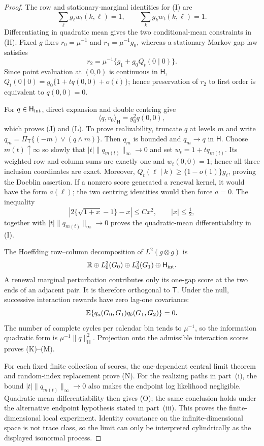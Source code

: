 \begin{proof}
The row and stationary-marginal identities for \textup{(I)} are
\[
 \sum_\ell g_\ell w_t(k,\ell)=1,
 \qquad
 \sum_k g_kw_t(k,\ell)=1.
\]
Differentiating in quadratic mean gives the two conditional-mean constraints
in \textup{(H)}.  Fixed $g$ fixes $r_0=\mu^{-1}$ and
$r_1=\mu^{-1}g_0$, whereas a stationary Markov gap law satisfies
\[
 r_2=\mu^{-1}\{g_1+g_0Q_t(0\mid0)\}.
\]
Since point evaluation at $(0,0)$ is continuous in $\mathsf H$,
$Q_t(0\mid0)=g_0\{1+tq(0,0)+o(t)\}$; hence preservation of $r_2$ to first
order is equivalent to $q(0,0)=0$.

For $q\in\mathsf H_{\rm int}$, direct expansion and double centring give
\[
 \langle q,v_0\rangle_{\mathsf H}=g_0^2q(0,0),
\]
which proves \textup{(J)} and \textup{(L)}.  To prove realizability, truncate
$q$ at levels $m$ and write
$q_m=\Pi_{\mathsf T}\{(-m)\vee(q\wedge m)\}$.  Then $q_m$ is bounded and
$q_m\to q$ in $\mathsf H$.  Choose $m(t)\uparrow\infty$ so slowly that
$|t|\|q_{m(t)}\|_\infty\to0$ and set
$w_t=1+tq_{m(t)}$.  Its weighted row and column sums are exactly one and
$w_t(0,0)=1$; hence all three inclusion coordinates are exact.  Moreover,
$Q_t(\ell\mid k)\geq\{1-o(1)\}g_\ell$, proving the Doeblin assertion.  If
a nonzero score generated a renewal kernel, it would have the form
$a(\ell)$; the two centring identities would then force $a=0$.
The inequality
\[
 \left|2\{\sqrt{1+x}-1\}-x\right|\leq Cx^2,
 \qquad |x|\leq\tfrac12,
\]
together with $|t|\|q_{m(t)}\|_\infty\to0$ proves the quadratic-mean
differentiability in \textup{(I)}.

The Hoeffding row--column decomposition of $L^2(g\otimes g)$ is
\[
 \mathbb R\oplus L^2_0(G_0)\oplus L^2_0(G_1)
 \oplus\mathsf H_{\rm int}.
\]
A renewal marginal perturbation contributes only its one-gap score at the two
ends of an adjacent pair.  It is therefore orthogonal to $\mathsf T$.
Under the null, successive interaction rewards have zero lag-one covariance:
\[
 \mathbb E\{q_a(G_0,G_1)q_b(G_1,G_2)\}=0.
\]
The number of complete cycles per calendar bin tends to $\mu^{-1}$, so the
information quadratic form is $\mu^{-1}\|q\|_{\mathsf H}^2$.  Projection
onto the admissible interaction scores proves \textup{(K)}--\textup{(M)}.

For each fixed finite collection of scores, the one-dependent central limit
theorem and random-index replacement prove \textup{(N)}.  For the realizing
paths in part~\textup{(i)}, the bound
$|t|\|q_{m(t)}\|_\infty\to0$ also makes the endpoint log likelihood
negligible.  Quadratic-mean differentiability then gives \textup{(O)}; the
same conclusion holds under the alternative endpoint hypothesis stated in
part~\textup{(iii)}.  This proves the finite-dimensional local experiment.
Identity covariance on the
infinite-dimensional space is not trace class, so the limit can only be
interpreted cylindrically as the displayed isonormal process.


\end{proof}
